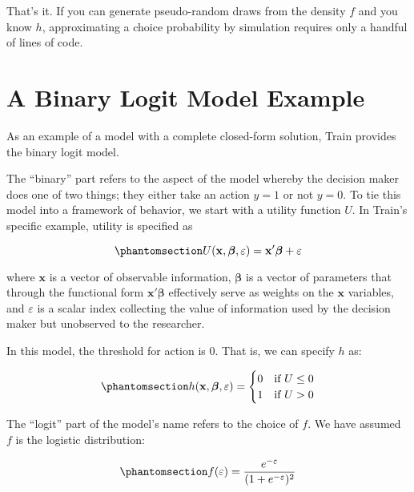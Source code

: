 \documentclass[
  letterpaper,
  DIV=11,
  numbers=noendperiod]{scrreprt}
\begin{document}
That's it. If you can generate pseudo-random draws from the density
\(f\) and you know \(h\), approximating a choice probability by
simulation requires only a handful of lines of code.

\section{A Binary Logit Model Example}\label{sec-binary_logit}

As an example of a model with a complete closed-form solution, Train
provides the binary logit model.

The ``binary'' part refers to the aspect of the model whereby the
decision maker does one of two things; they either take an action
\(y=1\) or not \(y=0\). To tie this model into a framework of behavior,
we start with a utility function \(U\). In Train's specific example,
utility is specified as

\begin{equation}\phantomsection\label{eq-u_binlogit}{
U(\mathbf{x}, \boldsymbol{\beta}, \varepsilon) = \mathbf{x}'\boldsymbol{\beta}+ \varepsilon
}\end{equation}

where \(\mathbf{x}\) is a vector of observable information,
\(\boldsymbol{\beta}\) is a vector of parameters that through the
functional form \(\mathbf{x}'\boldsymbol{\beta}\) effectively serve as
weights on the \(\mathbf{x}\) variables, and \(\varepsilon\) is a scalar
index collecting the value of information used by the decision maker but
unobserved to the researcher.

In this model, the threshold for action is 0. That is, we can specify
\(h\) as:

\begin{equation}\phantomsection\label{eq-h_binlogit}{
h(\mathbf{x}, \boldsymbol{\beta}, \varepsilon) = 
    \begin{cases}
        0  & \text{if } U \le 0 \\
        1  & \text{if } U > 0 
    \end{cases}
}\end{equation}

The ``logit'' part of the model's name refers to the choice of \(f\). We
have assumed \(f\) is the logistic distribution:

\begin{equation}\phantomsection\label{eq-bin_logistic_dist}{
f(\varepsilon) = \frac{e^{-\varepsilon}}{(1+e^{-\varepsilon})^2}
}\end{equation}
\end{document}
